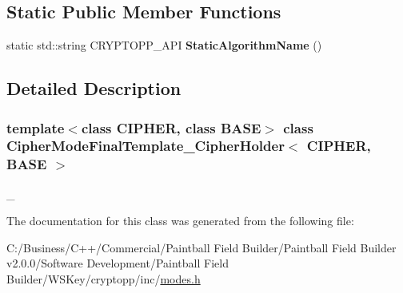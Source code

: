 \subsection*{Static Public Member Functions}
\begin{DoxyCompactItemize}
\item 
\hypertarget{class_cipher_mode_final_template___cipher_holder_ac89b9968d19910d438ec8a6a111e72b0}{
static std::string CRYPTOPP\_\-API {\bfseries StaticAlgorithmName} ()}
\label{class_cipher_mode_final_template___cipher_holder_ac89b9968d19910d438ec8a6a111e72b0}

\end{DoxyCompactItemize}


\subsection{Detailed Description}
\subsubsection*{template$<$class CIPHER, class BASE$>$ class CipherModeFinalTemplate\_\-CipherHolder$<$ CIPHER, BASE $>$}

\_\- 

The documentation for this class was generated from the following file:\begin{DoxyCompactItemize}
\item 
C:/Business/C++/Commercial/Paintball Field Builder/Paintball Field Builder v2.0.0/Software Development/Paintball Field Builder/WSKey/cryptopp/inc/\hyperlink{modes_8h}{modes.h}\end{DoxyCompactItemize}

